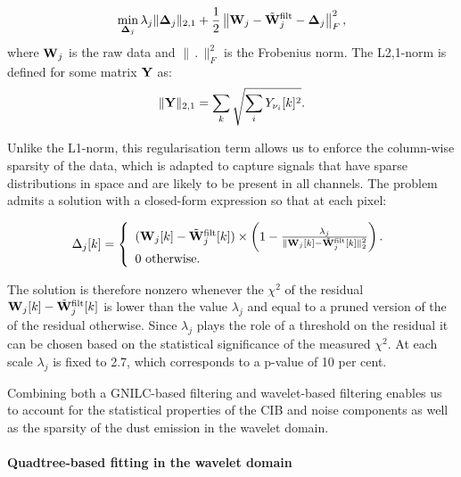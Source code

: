 \documentclass[a4paper,fleqn,usenatbib]{mnras}
\begin{document}
\begin{itemize}
\begin{eqnarray}
\min_{{\bf \Delta}_j} \lambda_j \|{\bf \Delta}_j \|_{2,1} + \frac{1}{2}\left\| {\bf W}_j - \tilde{\bf W}_j^{\rm{filt}} - {\bf \Delta}_j \right\|_F^2,
\end{eqnarray}
where ${\bf W}_j$ is the raw data and $\|\, . \,\|_F^2$ is the Frobenius norm. The L2,1-norm is defined for some matrix $\bf Y$ as:
\begin{eqnarray}
 \|{\bf Y}\|_{2,1} = \sum_k \sqrt{\sum_i{Y_{\nu_i}[k]^2}}. 
 \end{eqnarray}
 
Unlike the L1-norm, this regularisation term allows us to enforce the column-wise sparsity of the data, which is adapted to capture signals that have sparse distributions in space and are likely to be present in all channels. The problem admits a solution with a closed-form expression \citep{kowalski2009sparse} so that at each pixel:
 
\begin{equation}
\Delta_j[k] =  \left\{\begin{array}{l}
({\bf W}_j[k] - \tilde{\bf W}^{\rm{filt}}_j[k]) \times\left( 1 - \frac{ \lambda_j }{\| {\bf W}_j[k] - \tilde{\bf W}^{\rm{filt}}_j[k] \|_2^2}\right). \\
0 \mbox{ otherwise.}
\end{array}
\right.
\end{equation}

The solution is therefore nonzero whenever the $\chi^2$ of the residual ${\bf W}_j[k] - \tilde{\bf W}^{\rm{filt}}_j[k]$ is lower than the value $\lambda_j$ and equal to a pruned version of the of the residual otherwise. Since $\lambda_j$ plays the role of a threshold on the residual it can be chosen based on the statistical significance of the measured $\chi^2$. At each scale $\lambda_j$ is fixed to 2.7, which corresponds to a p-value of 10 per cent.

\end{itemize}

Combining both a GNILC-based filtering and wavelet-based filtering enables us to account for the statistical properties of the CIB and noise components as well as the sparsity of the dust emission in the wavelet domain.

\paragraph*{Quadtree-based fitting in the wavelet domain}
\end{document}
